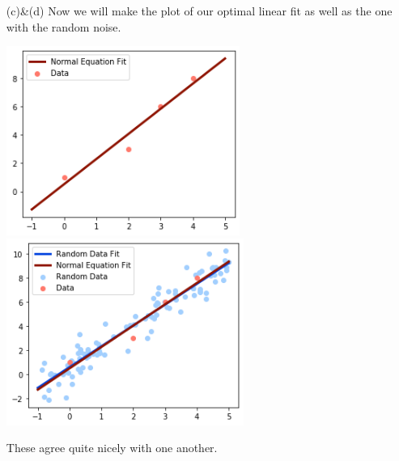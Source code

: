 \documentclass[12pt,letterpaper]{hmcpset}
\begin{document}
\begin{solution}
\begin{enumerate}
        \item[(c)\&(d)] Now we will make the plot of our optimal linear fit as well as the one with the random noise.
        \begin{center}
            \includegraphics[width = 3in]{data_plot.png} 
            \includegraphics[width = 3.05in]{random_plot.png}
        \end{center}
        These agree quite nicely with one another.
    \end{enumerate}
\end{solution}
\newpage
\end{document}
